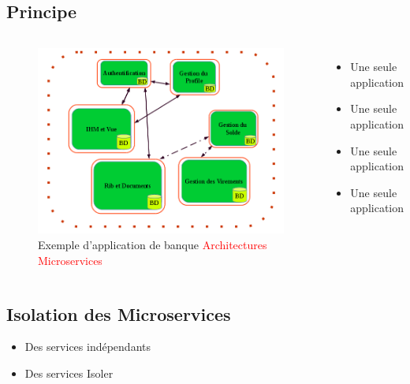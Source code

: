 \documentclass{beamer}
\begin{document}
\subsection*{Principe}
    \begin{columns}
        \begin{figure}
            \begin{center}
            \includegraphics[width=1\textwidth]{Microservices.png}
                \caption{Exemple d'application de banque \textcolor{red}{Architectures Microservices}}
            \end{center}
        \end{figure}
        \begin{itemize}
            \item Une seule application
            \item Une seule application
            \item Une seule application
            \item Une seule application
        \end{itemize} 
    \end{columns}

\subsection*{Isolation des Microservices}

\begin{frame}
\begin{itemize}
         \item Des services ind\'ependants
         \item Des services Isoler
\end{itemize}
\end{frame}
\end{document}
